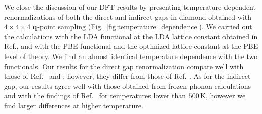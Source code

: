 \documentclass[journal=jctcce,manuscript=article]{achemso}
\newcommand{\bfq}{{\mathbf{q}}}
\begin{document}
We close the discussion of our DFT results by presenting temperature-dependent renormalizations of both the direct and indirect gaps in diamond obtained with $4\times 4\times 4$ $\bfq$-point sampling (Fig.~\ref{fig:temperature_dependence}). We carried out the calculations with the LDA functional at the LDA lattice constant obtained in Ref., and with the PBE functional and the optimized lattice constant at the PBE level of theory. We find an almost identical temperature dependence with the two functionals. Our results for the direct gap renormalization compare well with those of  Ref.~ and ; however, they differ from those of Ref. . As for the indirect gap, our results agree well with those obtained from  frozen-phonon calculations\cite{kundu2021quantum} and with the findings of Ref.~ for temperatures lower than $500\,\mathrm{K}$, however we find larger differences at higher temperature.%


\end{document}
